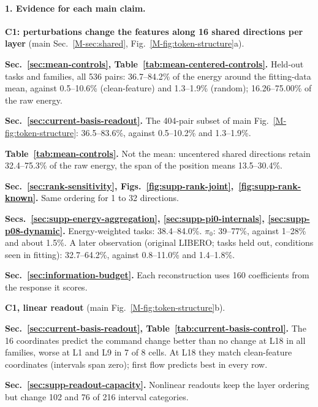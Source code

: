 \paragraph{1. Evidence for each main claim.}
\textbf{C1: perturbations change the features along 16 shared directions per layer} (main Sec.~\ref{M-sec:shared}, Fig.~\ref{M-fig:token-structure}a).
\begin{guidelist}
\item \textbf{Sec.~\ref{sec:mean-controls}, Table~\ref{tab:mean-centered-controls}.} Held-out tasks and families, all 536 pairs: 36.7--84.2\% of the energy around the fitting-data mean, against 0.5--10.6\% (clean-feature) and 1.3--1.9\% (random); 16.26--75.00\% of the raw energy.
\item \textbf{Sec.~\ref{sec:current-basis-readout}.} The 404-pair subset of main Fig.~\ref{M-fig:token-structure}: 36.5--83.6\%, against 0.5--10.2\% and 1.3--1.9\%.
\item \textbf{Table~\ref{tab:mean-controls}.} Not the mean: uncentered shared directions retain 32.4--75.3\% of the raw energy, the span of the position means 13.5--30.4\%.
\item \textbf{Sec.~\ref{sec:rank-sensitivity}, Figs.~\ref{fig:supp-rank-joint},~\ref{fig:supp-rank-known}.} Same ordering for 1 to 32 directions.
\item \textbf{Secs.~\ref{sec:supp-energy-aggregation}, \ref{sec:supp-pi0-internals}, \ref{sec:supp-p08-dynamic}.} Energy-weighted tasks: 38.4--84.0\%. $\pi_0$: 39--77\%, against 1--28\% and about 1.5\%. A later observation (original LIBERO; tasks held out, conditions seen in fitting): 32.7--64.2\%, against 0.8--11.0\% and 1.4--1.8\%.
\item \textbf{Sec.~\ref{sec:information-budget}.} Each reconstruction uses 160 coefficients from the response it scores.
\end{guidelist}
\textbf{C1, linear readout} (main Fig.~\ref{M-fig:token-structure}b).
\begin{guidelist}
\item \textbf{Sec.~\ref{sec:current-basis-readout}, Table~\ref{tab:current-basis-control}.} The 16 coordinates predict the command change better than no change at L18 in all families, worse at L1 and L9 in 7 of 8 cells. At L18 they match clean-feature coordinates (intervals span zero); first flow predicts best in every row.
\item \textbf{Sec.~\ref{sec:supp-readout-capacity}.} Nonlinear readouts keep the layer ordering but change 102 and 76 of 216 interval categories.
\end{guidelist}
